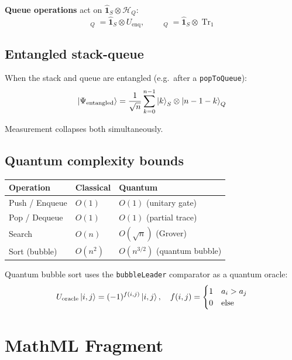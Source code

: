 \documentclass[12pt,a4paper]{article}
\DeclareMathOperator{\Enq}{\widehat{Q}^\dagger}
\DeclareMathOperator{\Deq}{\widehat{Q}}
\begin{document}
\textbf{Queue operations} act on $\hat{\mathbf{1}}_S \otimes \mathcal{H}_Q$:
\[
  \Enq_Q = \hat{\mathbf{1}}_S \otimes U_{\text{enq}},\qquad
  \Deq_Q = \hat{\mathbf{1}}_S \otimes \operatorname{Tr}_1
\]

\subsection{Entangled stack-queue}

When the stack and queue are entangled (e.g.\ after a \texttt{popToQueue}):
\[
  \ket{\Psi_{\text{entangled}}} = \frac{1}{\sqrt{n}}\sum_{k=0}^{n-1}
  \ket{k}_S \otimes \ket{n-1-k}_Q
\]

Measurement collapses both simultaneously.

\subsection{Quantum complexity bounds}

\begin{center}
\begin{tabular}{@{}lll@{}}
\toprule
\textbf{Operation} & \textbf{Classical} & \textbf{Quantum}\\
\midrule
Push / Enqueue      & $O(1)$             & $O(1)$ (unitary gate)\\
Pop / Dequeue       & $O(1)$             & $O(1)$ (partial trace)\\
Search              & $O(n)$             & $O(\sqrt{n})$ (Grover)\\
Sort (bubble)       & $O(n^2)$           & $O(n^{3/2})$ (quantum bubble)\\
\bottomrule
\end{tabular}
\end{center}

Quantum bubble sort uses the \texttt{bubbleLeader} comparator as a quantum oracle:
\[
  U_{\text{oracle}}\ket{i,j} = (-1)^{f(i,j)}\ket{i,j},
  \quad f(i,j) = \begin{cases}1 & a_i > a_j \\ 0 & \text{else}\end{cases}
\]

\section{MathML Fragment}
\end{document}
